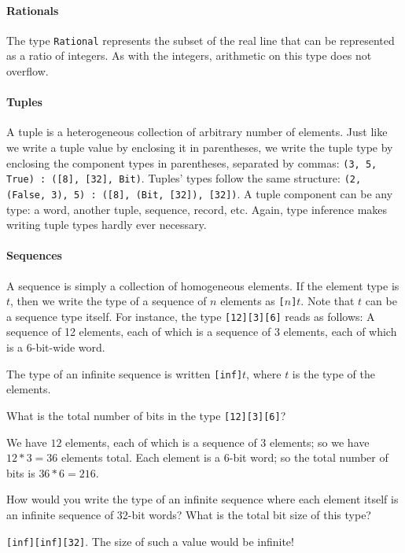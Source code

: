 \paragraph*{Rationals}\indTheRationalType The type \texttt{Rational} represents
the subset of the real line that can be represented as a ratio of integers.
As with the integers, arithmetic on this type does not overflow.

\paragraph*{Tuples}\indTheTupleType A tuple is a heterogeneous
collection of arbitrary number of
elements. Just like we write a tuple value by enclosing it in
parentheses, we write the tuple type by enclosing the component types
in parentheses, separated by commas: \texttt{(3, 5, True) :\ ([8], [32],
  Bit)}. Tuples' types follow the same structure: \texttt{(2, (False, 3),
  5) :\ ([8], (Bit, [32]), [32])}.  A tuple component can be any type:
a word, another tuple, sequence, record, etc. Again, type inference
makes writing tuple types hardly ever necessary.\indTypeInference

\paragraph*{Sequences}\indTheSequenceType A sequence is simply a
collection of homogeneous elements. If the element type is $t$,
then we write the type of a sequence of $n$ elements as \texttt{[}$n$\texttt{]}$t$.
Note that $t$ can be a sequence type itself. For
instance, the type {\tt [12][3][6]} reads as follows: A sequence of
12 elements, each of which is a sequence of 3 elements, each of which
is a 6-bit-wide word.

The type of an infinite sequence is written \texttt{[inf]}$t$, where $t$
is the type of the elements.\indInfSeq \indInf

\begin{Exercise}\label{ex:types:1}
What is the total number of bits in the type {\tt [12][3][6]}?
\end{Exercise}
\begin{Answer}
  We have $12$ elements, each of which is a sequence of $3$ elements;
  so we have $12*3=36$ elements total. Each element is a 6-bit word;
  so the total number of bits is $36*6 = 216$.
\end{Answer}

\begin{Exercise}\label{ex:types:2}
  How would you write the type of an infinite sequence where each
  element itself is an infinite sequence of 32-bit words? What is the
  total bit size of this type?
\end{Exercise}
\begin{Answer} {\tt [inf][inf][32]}. The size of
  such a value would be infinite!
\end{Answer}

